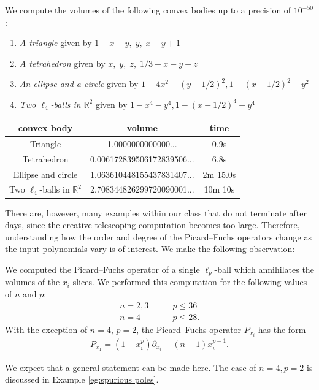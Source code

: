 \documentclass[sigconf, nonacm]{acmart} %
\begin{document}
\begin{example}\label{eg:volumes-many-bodies}
We compute the volumes of the following convex bodies up to a precision of $10^{-50}$:
\begin{enumerate}
    \item \textit{A triangle} given by $1 - x - y, \;y,\; x - y + 1 $
    \item \textit{A tetrahedron}  given by $x,\; y, \;z, \; 1/3 - x - y- z $
    \item \textit{An ellipse and a circle} given by $1 - 4x^2 - (y-1/2)^2, 1 - (x-1/2)^2 - y^2$
    \item \textit{Two $\ell_4$-balls in $\mathbb R^2$} given by $1 - x^4 - y^4, 1 - (x-1/2)^4 - y^4$
\end{enumerate}


    \begin{center}
\begin{tabular}{ |c|c|c| } 
 \hline
 \textbf{convex body} & \textbf{volume} & \textbf{time} \\ 
 \hline
 Triangle & 1.0000000000000... & 0.9s \\ 
 Tetrahedron  & 0.006172839506172839506... & 6.8s \\ 
 Ellipse and circle & 1.063610448155437831407... & 2m 15.0s \\
 Two $\ell_4$-balls in $\mathbb R^2$ & 2.708344826299720090001... & 10m 10s \\
 \hline
\end{tabular}
\end{center}
\end{example}


There are, however, many examples within our class that do not terminate after days, since the creative telescoping computation becomes too large. Therefore, understanding how the order and degree of the Picard--Fuchs operators change as the input polynomials vary is of interest. 
We make the following observation:
\begin{example}
    We computed the Picard--Fuchs operator of a single $\ell_p$-ball which annihilates the volumes of the $x_i$-slices. We performed this computation for the following values of $n$ and $p$:
    \begin{align*}
        n = 2,3 & \qquad p \leq 36\\
        n = 4 & \qquad p \leq 28.
    \end{align*}
    With the exception of $n=4$, $p=2$, 
    the Picard--Fuchs operator $P_{x_i}$ 
    has the form
    \begin{align}
        P_{x_1} = (1 - x_i^p) \partial_{x_i} + (n-1)x_i^{p-1}.
    \end{align}
\end{example} 
We expect that a general statement can be made here. The case of $n=4,p=2$ is discussed in Example \ref{eg:spurious poles}.
\end{document}
